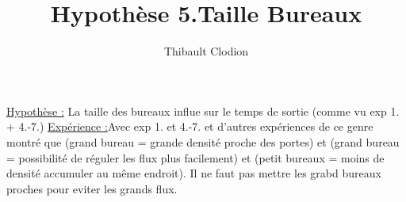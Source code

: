 \documentclass[12pt]{article}
\title{Hypothèse 5.Taille Bureaux}
\author{Thibault Clodion}
\begin{document}
\maketitle %

\underline{Hypothèse :} La taille des bureaux influe sur le temps de sortie (comme vu exp 1. +
4.-7.)
\newline\newline
\underline{Expérience :}Avec exp 1. et 4.-7. et d’autres expériences de ce genre montré que
(grand bureau = grande densité proche des portes) et (grand bureau
= possibilité de réguler les flux plus facilement) et (petit bureaux =
moins de densité accumuler au même endroit).
\newline
Il ne faut pas mettre les grabd bureaux proches pour eviter les grands flux.
\newline\newline
\end{document}
